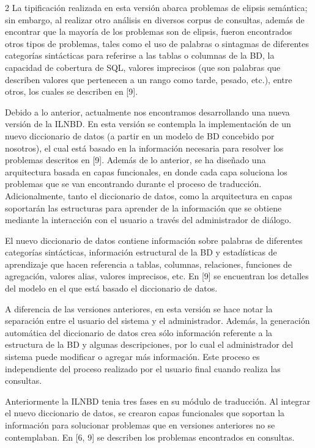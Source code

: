 \documentclass[letterpaper,10pt,final,hyphenatedtitles]{papertexKS}
\begin{document}
\begin{news}{2}
La tipificación realizada en esta versión abarca problemas de elipsis semántica; sin embargo, al realizar otro análisis en diversos corpus de consultas, además de encontrar que la mayoría de los problemas son de elipsis, fueron encontrados otros tipos de problemas, tales como el uso de palabras o sintagmas de diferentes categorías sintácticas para referirse a las tablas o columnas de la BD, la capacidad de cobertura de SQL, valores imprecisos (que son palabras que describen valores que pertenecen a un rango como tarde, pesado, etc.), entre otros, los cuales se describen en [9].

Debido a lo anterior, actualmente nos encontramos desarrollando una nueva versión de la ILNBD. En esta versión se contempla la implementación de un nuevo diccionario de datos (a partir en un modelo de BD concebido por nosotros), el cual está basado en la información necesaria para resolver los problemas descritos en [9]. Además de lo anterior, se ha diseñado una arquitectura basada en capas funcionales, en donde cada capa soluciona los problemas que se van encontrando durante el proceso de traducción. Adicionalmente,  tanto el diccionario de datos, como la arquitectura en capas soportarán las estructuras para aprender de la información que se obtiene mediante la interacción con el usuario a través del administrador de diálogo.

El nuevo diccionario de datos contiene información sobre palabras de diferentes categorías sintácticas, información estructural de la BD y estadísticas de aprendizaje que hacen referencia a tablas, columnas, relaciones, funciones de agregación, valores alias, valores imprecisos, etc. En [9] se encuentran los detalles del modelo en el que está basado el diccionario de datos.
	
A diferencia de las versiones anteriores, en esta versión se hace notar la separación entre el usuario del sistema y el administrador. Además, la generación automática del diccionario de datos crea sólo información referente a la estructura de la BD y algunas descripciones, por lo cual el administrador del sistema puede modificar o agregar  más  información. Este proceso es independiente del proceso realizado por el usuario final cuando realiza las consultas.

Anteriormente la ILNBD tenia tres fases en su módulo de traducción. Al integrar el nuevo diccionario de datos, se crearon capas funcionales que soportan la información para solucionar problemas que en versiones anteriores no se contemplaban. En [6, 9] se describen los problemas encontrados en consultas.


\end{news}
\end{document}
